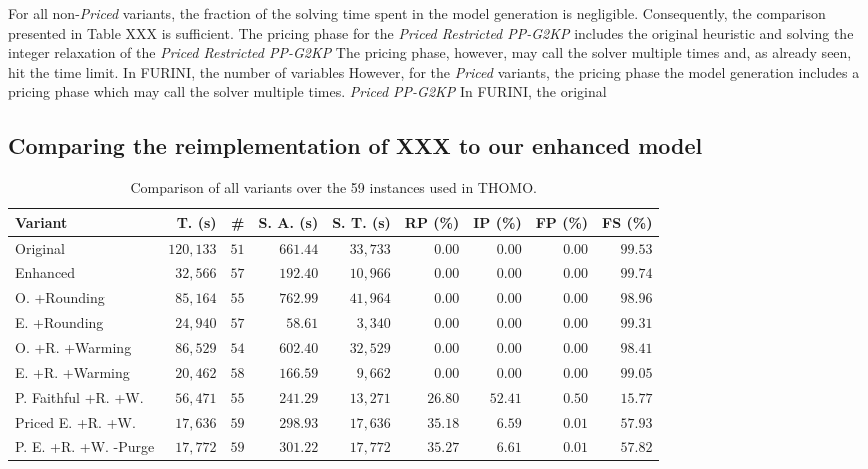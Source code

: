 \documentclass[smallextended]{svjour3}       %
\begin{document}
For all non-\emph{Priced} variants, the fraction of the solving time spent in the model generation is negligible.
Consequently, the comparison presented in Table XXX is sufficient.
The pricing phase for the \emph{Priced Restricted PP-G2KP} includes the original heuristic and solving the integer relaxation of the \emph{Priced Restricted PP-G2KP} 
The pricing phase, however, may call the solver multiple times and, as already seen, hit the time limit.
In FURINI, the number of variables 
However, for the \emph{Priced} variants, the pricing phase 
the model generation includes a pricing phase which may call the solver multiple times.
\emph{Priced PP-G2KP} 
In FURINI, the original 

\subsection{Comparing the reimplementation of XXX to our enhanced model}

\begin{table}
\caption{Comparison of all variants over the 59 instances used in THOMO.}
\begin{tabular}{lrrrrrrrr}
\hline\hline
\textbf{Variant} & \textbf{T. (s)} & \textbf{\#} & \textbf{S. A. (s)} & \textbf{S. T. (s)} & \textbf{RP (\%)} & \textbf{IP (\%)} & \textbf{FP (\%)} & \textbf{FS (\%)} \\\hline
Original & \(120,133\) & \(51\) & \(661.44\) & \(33,733\) & \(0.00\) & \(0.00\) & \(0.00\) & \(99.53\) \\
Enhanced & \(32,566\) & \(57\) & \(192.40\) & \(10,966\) & \(0.00\) & \(0.00\) & \(0.00\) & \(99.74\) \\
O. +Rounding & \(85,164\) & \(55\) & \(762.99\) & \(41,964\) & \(0.00\) & \(0.00\) & \(0.00\) & \(98.96\) \\
E. +Rounding & \(24,940\) & \(57\) & \(58.61\) & \(3,340\) & \(0.00\) & \(0.00\) & \(0.00\) & \(99.31\) \\
O. +R. +Warming & \(86,529\) & \(54\) & \(602.40\) & \(32,529\) & \(0.00\) & \(0.00\) & \(0.00\) & \(98.41\) \\
E. +R. +Warming & \(20,462\) & \(58\) & \(166.59\) & \(9,662\) & \(0.00\) & \(0.00\) & \(0.00\) & \(99.05\) \\
P. Faithful +R. +W. & \(56,471\) & \(55\) & \(241.29\) & \(13,271\) & \(26.80\) & \(52.41\) & \(0.50\) & \(15.77\) \\
Priced E. +R. +W. & \(17,636\) & \(59\) & \(298.93\) & \(17,636\) & \(35.18\) & \(6.59\) & \(0.01\) & \(57.93\) \\
P. E. +R. +W. -Purge & \(17,772\) & \(59\) & \(301.22\) & \(17,772\) & \(35.27\) & \(6.61\) & \(0.01\) & \(57.82\) \\\hline\hline
\end{tabular}
\label{tab:contribution}
\end{table}
\end{document}
